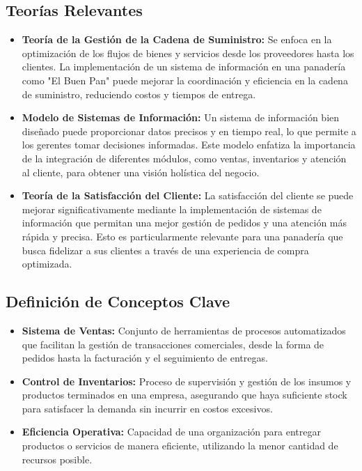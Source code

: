 \documentclass[conference]{IEEEtran}
\begin{document}
\subsection{Teorías Relevantes}
\begin{itemize}
    \item \textbf{Teoría de la Gestión de la Cadena de Suministro:} Se enfoca en la optimización de los flujos de bienes y servicios desde los proveedores hasta los clientes. La implementación de un sistema de información en una panadería como "El Buen Pan" puede mejorar la coordinación y eficiencia en la cadena de suministro, reduciendo costos y tiempos de entrega.
    \item \textbf{Modelo de Sistemas de Información:} Un sistema de información bien diseñado puede proporcionar datos precisos y en tiempo real, lo que permite a los gerentes tomar decisiones informadas. Este modelo enfatiza la importancia de la integración de diferentes módulos, como ventas, inventarios y atención al cliente, para obtener una visión holística del negocio.
    \item \textbf{Teoría de la Satisfacción del Cliente:} La satisfacción del cliente se puede mejorar significativamente mediante la implementación de sistemas de información que permitan una mejor gestión de pedidos y una atención más rápida y precisa. Esto es particularmente relevante para una panadería que busca fidelizar a sus clientes a través de una experiencia de compra optimizada.
\end{itemize}

\subsection{Definición de Conceptos Clave}
\begin{itemize}
    \item \textbf{Sistema de Ventas:} Conjunto de herramientas de procesos automatizados que facilitan la gestión de transacciones comerciales, desde la forma de pedidos hasta la facturación y el seguimiento de entregas.
    \item \textbf{Control de Inventarios:} Proceso de supervisión y gestión de los insumos y productos terminados en una empresa, asegurando que haya suficiente stock para satisfacer la demanda sin incurrir en costos excesivos.
    \item \textbf{Eficiencia Operativa:} Capacidad de una organización para entregar productos o servicios de manera eficiente, utilizando la menor cantidad de recursos posible.
\end{itemize}
\end{document}

